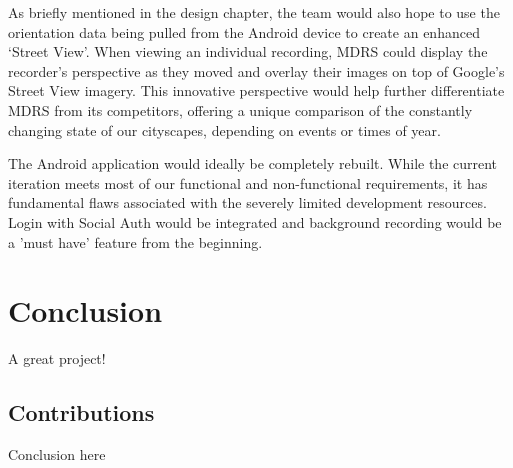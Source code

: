 \documentclass{l3proj}
\begin{document}
As briefly mentioned in the design chapter, the team would also hope to use the orientation data being pulled from the Android device to create an enhanced ‘Street View’. When viewing an individual recording, MDRS could display the recorder’s perspective as they moved and overlay their images on top of Google’s Street View imagery. This innovative perspective would help further differentiate MDRS from its competitors, offering a unique comparison of the constantly changing state of our cityscapes, depending on events or times of year.

The Android application would ideally be completely rebuilt. While the current iteration meets most of our functional and non-functional requirements, it has fundamental flaws associated with the severely limited development resources. Login with Social Auth would be integrated and background recording would be a 'must have' feature from the beginning.

\chapter{Conclusion}

A great project!

\section{Contributions}

Conclusion here



\printglossaries
\end{document}
